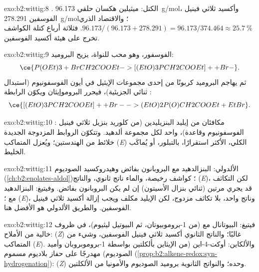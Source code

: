 \begin{solution}{exo:b2:wittig:8}
. الكتل: ميثيلين هكسان حلقي \qty{96.173}{g/mol}،
وأكسيد ثلاثي فينيل الفوسفين \qty{278.291}{g/mol}؛ والاقتصاد الذري $96.173/(96.173 + 278.291) =
96.173/374.464 \approx 25.7~\%$. فثلاثة أرباع كتلة الكواشف تخرج على هيئة أكسيد الفوسفين.
\end{solution}

\begin{solution}{exo:b2:wittig:9}
الفوسفور، وهو محب للنواة، يزيح البروميد:
\begin{equation*}
\ce{P(OEt)3 + BrCH2COOEt -> [(EtO)3PCH2COOEt]+ + Br-}.
\end{equation*}
ثم يهاجم
البروميد كربونًا من إحدى مجموعات الإيثيل في أيون الفوسفونيوم (استبدال ثنائي الجزيئية)، فيحرر
البروموإيثان ويكوّن الرابطة :
\begin{equation*}
\ce{[(EtO)3PCH2COOEt]+ + Br- -> (EtO)2P(O)CH2COOEt + EtBr}.
\end{equation*}
\end{solution}

\begin{solution}{exo:b2:wittig:10}
: مكافئان من
إيليد البنزيليدين (من كلوريد بنزيل ثلاثي فينيل الفوسفونيوم وقاعدة)، واحد لكل مجموعة ألدهيد.
وتتكوّن الروابط المزدوجة الجديدة خلائط من الهندستين؛ ويُعزل المتماكب (\textit{E}) الكلي، الأكثر
استقرارًا، بالتبلور، أو يُماكَب الخليط.
\end{solution}

\begin{solution}{exo:b2:wittig:11}
الألدولي: البنزالدهيد مع البروبانون بفائض وهيدروكسيد الصوديوم (\cref{ch:b2:enolates-aldol})؛
كواشف رخيصة، والماء ناتج ثانوي، والناتج (\textit{E})، لكن التكاثف قد يجري مرتين
(ثنائي بنزال الأسيتون) إن لم يكن البروبانون بفائض. وفيتيغ: البنزالدهيد مع 
؛ (\textit{E})، وناتج واحد، بلا تكاثف مزدوج، لكن الإيليد مكلف 
ويجب إزالة أكسيد ثلاثي فينيل الفوسفين. والطريق الألدولي هو الأفضل هنا.
\end{solution}

\begin{solution}{exo:b2:wittig:12}
فيتيغ: البيوتانال مع  (من 1-بروموبيوتان، ثم البيوتيل ليثيوم)، في ظروف خالية من الأملاح:
(\textit{Z}) غالبًا؛ والناتج الثانوي أكسيد ثلاثي فينيل الفوسفين، وشيء من المتماكب (\textit{E}). والألكاين:
أوكت-4-اين (من الإيثاين بألكلتين بواسطة 1-بروموبروبان وأميد الصوديوم) مهدرجًا على
حفاز بلاديوم مسموم (\cref{prop:b2:alkene-redox:syn-hydrogenation}): (\textit{Z}) وحده؛ 
والنواتج الثانوية بروميد الصوديوم والأمونيا من الألكلتين.
\end{solution}

